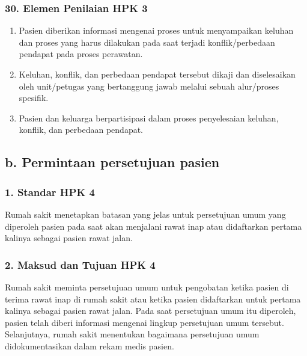 \documentclass[
]{book}
\providecommand{\tightlist}{%
  \setlength{\itemsep}{0pt}\setlength{\parskip}{0pt}}
\begin{document}
\hypertarget{elemen-penilaian-hpk-3}{%
\subsubsection*{30. Elemen Penilaian HPK 3}\label{elemen-penilaian-hpk-3}}

\begin{enumerate}
\def\labelenumi{\alph{enumi}.}
\tightlist
\item
  Pasien diberikan informasi mengenai proses untuk menyampaikan keluhan dan proses yang harus dilakukan pada saat terjadi konflik/perbedaan pendapat pada proses perawatan.
\item
  Keluhan, konflik, dan perbedaan pendapat tersebut dikaji dan diselesaikan oleh unit/petugas yang bertanggung jawab melalui sebuah alur/proses spesifik.
\item
  Pasien dan keluarga berpartisipasi dalam proses penyelesaian keluhan, konflik, dan perbedaan pendapat.
\end{enumerate}

\hypertarget{b.-permintaan-persetujuan-pasien}{%
\subsection*{b. Permintaan persetujuan pasien}\label{b.-permintaan-persetujuan-pasien}}

\hypertarget{standar-hpk-4}{%
\subsubsection*{1. Standar HPK 4}\label{standar-hpk-4}}

Rumah sakit menetapkan batasan yang jelas untuk persetujuan umum yang diperoleh pasien pada saat akan menjalani rawat inap atau didaftarkan pertama kalinya sebagai pasien rawat jalan.

\hypertarget{maksud-dan-tujuan-hpk-4}{%
\subsubsection*{2. Maksud dan Tujuan HPK 4}\label{maksud-dan-tujuan-hpk-4}}

Rumah sakit meminta persetujuan umum untuk pengobatan ketika pasien di terima rawat inap di rumah sakit atau ketika pasien didaftarkan untuk pertama kalinya sebagai pasien rawat jalan. Pada saat persetujuan umum itu diperoleh, pasien telah diberi informasi mengenai lingkup persetujuan umum tersebut. Selanjutnya, rumah sakit menentukan bagaimana persetujuan umum didokumentasikan dalam rekam medis pasien.
\end{document}
